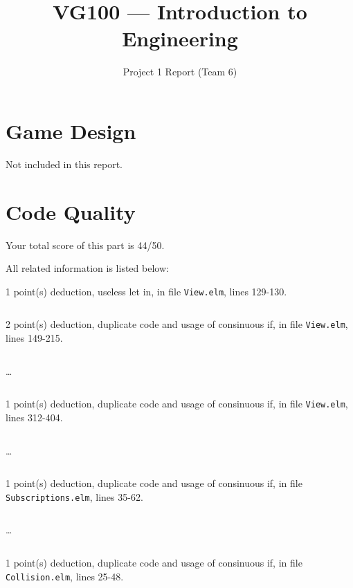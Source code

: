 \documentclass{article}
\title{VG100 --- Introduction to\\ Engineering}
\subtitle{Project 1 Report (Team 6)}
\begin{document}
\maketitle

\section{Game Design}

Not included in this report.

\section{Code Quality}

Your total score of this part is 44/50. \medskip

All related information is listed below: \medskip

1 point(s) {\color{red}deduction}, useless let in, in file {\color{blue}\texttt{View.elm}}, lines {\color{blue}129-130}.

\inputminted[firstline=129,lastline=130]{elm}{View.elm}

2 point(s) {\color{red}deduction}, duplicate code and usage of consinuous if, in file {\color{blue}\texttt{View.elm}}, lines {\color{blue}149-215}.

\inputminted[firstline=149,lastline=158]{elm}{View.elm}

\dots

\inputminted[firstline=206,lastline=215]{elm}{View.elm}

1 point(s) {\color{red}deduction}, duplicate code and usage of consinuous if, in file {\color{blue}\texttt{View.elm}}, lines {\color{blue}312-404}.

\inputminted[firstline=312,lastline=321]{elm}{View.elm}

\dots

\inputminted[firstline=395,lastline=404]{elm}{View.elm}

1 point(s) {\color{red}deduction}, duplicate code and usage of consinuous if, in file {\color{blue}\texttt{Subscriptions.elm}}, lines {\color{blue}35-62}.

\inputminted[firstline=35,lastline=44]{elm}{Subscriptions.elm}

\dots

\inputminted[firstline=53,lastline=62]{elm}{Subscriptions.elm}

1 point(s) {\color{red}deduction}, duplicate code and usage of consinuous if, in file {\color{blue}\texttt{Collision.elm}}, lines {\color{blue}25-48}.
\end{document}
